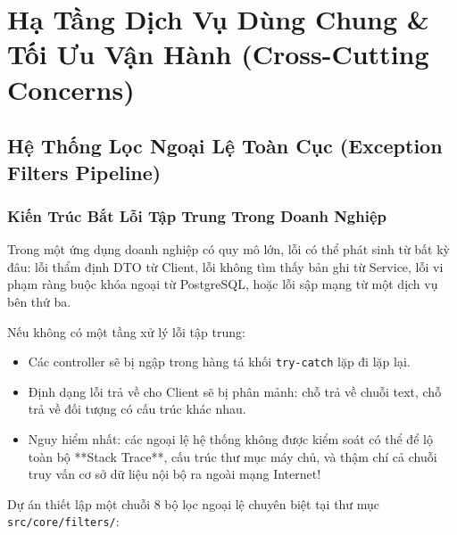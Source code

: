 \documentclass[12pt,a4paper,oneside]{book}
\begin{document}
\part{Hạ Tầng Dịch Vụ Dùng Chung \& Tối Ưu Vận Hành (Cross-Cutting Concerns)}

\chapter{Hệ Thống Lọc Ngoại Lệ Toàn Cục (Exception Filters Pipeline)}

\section{Kiến Trúc Bắt Lỗi Tập Trung Trong Doanh Nghiệp}
Trong một ứng dụng doanh nghiệp có quy mô lớn, lỗi có thể phát sinh từ bất kỳ đâu: lỗi thẩm định DTO từ Client, lỗi không tìm thấy bản ghi từ Service, lỗi vi phạm ràng buộc khóa ngoại từ PostgreSQL, hoặc lỗi sập mạng từ một dịch vụ bên thứ ba.

Nếu không có một tầng xử lý lỗi tập trung:
\begin{itemize}
  \item Các controller sẽ bị ngập trong hàng tá khối \texttt{try-catch} lặp đi lặp lại.
  \item Định dạng lỗi trả về cho Client sẽ bị phân mảnh: chỗ trả về chuỗi text, chỗ trả về đối tượng có cấu trúc khác nhau.
  \item Nguy hiểm nhất: các ngoại lệ hệ thống không được kiểm soát có thể để lộ toàn bộ **Stack Trace**, cấu trúc thư mục máy chủ, và thậm chí cả chuỗi truy vấn cơ sở dữ liệu nội bộ ra ngoài mạng Internet!
\end{itemize}

Dự án thiết lập một chuỗi 8 bộ lọc ngoại lệ chuyên biệt tại thư mục \texttt{src/core/filters/}:
\end{document}
